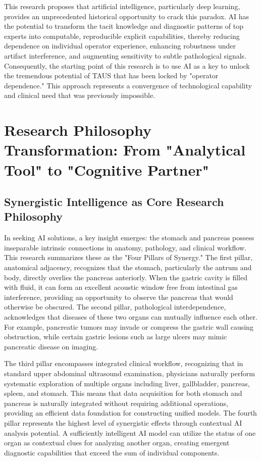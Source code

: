 This research proposes that artificial intelligence, particularly deep learning, provides an unprecedented historical opportunity to crack this paradox. AI has the potential to transform the tacit knowledge and diagnostic patterns of top experts into computable, reproducible explicit capabilities, thereby reducing dependence on individual operator experience, enhancing robustness under artifact interference, and augmenting sensitivity to subtle pathological signals. Consequently, the starting point of this research is to use AI as a key to unlock the tremendous potential of TAUS that has been locked by "operator dependence." This approach represents a convergence of technological capability and clinical need that was previously impossible.

\section{Research Philosophy Transformation: From "Analytical Tool" to "Cognitive Partner"}

\subsection{Synergistic Intelligence as Core Research Philosophy}

In seeking AI solutions, a key insight emerges: the stomach and pancreas possess inseparable intrinsic connections in anatomy, pathology, and clinical workflow. This research summarizes these as the "Four Pillars of Synergy." The first pillar, anatomical adjacency, recognizes that the stomach, particularly the antrum and body, directly overlies the pancreas anteriorly. When the gastric cavity is filled with fluid, it can form an excellent acoustic window free from intestinal gas interference, providing an opportunity to observe the pancreas that would otherwise be obscured. The second pillar, pathological interdependence, acknowledges that diseases of these two organs can mutually influence each other. For example, pancreatic tumors may invade or compress the gastric wall causing obstruction, while certain gastric lesions such as large ulcers may mimic pancreatic disease on imaging.

The third pillar encompasses integrated clinical workflow, recognizing that in standard upper abdominal ultrasound examination, physicians naturally perform systematic exploration of multiple organs including liver, gallbladder, pancreas, spleen, and stomach. This means that data acquisition for both stomach and pancreas is naturally integrated without requiring additional operations, providing an efficient data foundation for constructing unified models. The fourth pillar represents the highest level of synergistic effects through contextual AI analysis potential. A sufficiently intelligent AI model can utilize the status of one organ as contextual clues for analyzing another organ, creating emergent diagnostic capabilities that exceed the sum of individual components.

